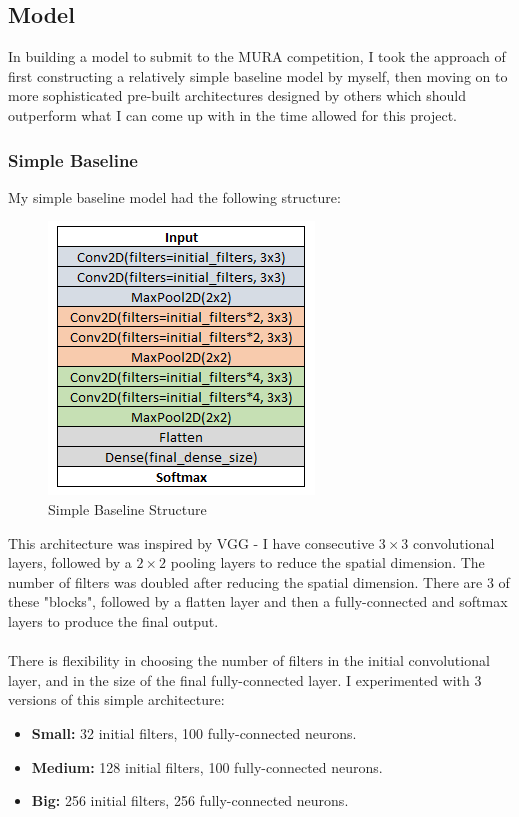 \documentclass[11pt]{article} %
\theoremstyle{plain}
\theoremstyle{definition}
\begin{document}
\subsection{Model}
In building a model to submit to the MURA competition, I took the approach of first constructing a relatively simple baseline model by myself, then moving on to more sophisticated pre-built architectures designed by others which should outperform what I can come up with in the time allowed for this project.
\subsubsection{Simple Baseline} \label{Simple-Baseline}
My simple baseline model had the following structure:
\begin{figure}[!ht]
\centering
\includegraphics[scale=0.7]{SimpleBaselineModel.PNG}
\caption{Simple Baseline Structure}
\label{fig:SimpleBaselineModel}
\end{figure}
\FloatBarrier
\noindent
This architecture was inspired by VGG - I have consecutive \(3 \times 3\) convolutional layers, followed by a \(2 \times 2\) pooling layers to reduce the spatial dimension. The number of filters was doubled after reducing the spatial dimension. There are 3 of these "blocks", followed by a flatten layer and then a fully-connected and softmax layers to produce the final output. 
\\
\\
\noindent
There is flexibility in choosing the number of filters in the initial convolutional layer, and in the size of the final fully-connected layer. I experimented with 3 versions of this simple architecture:
\begin{itemize}
\item \textbf{Small:} 32 initial filters, 100 fully-connected neurons.
\item \textbf{Medium:} 128 initial filters, 100 fully-connected neurons.
\item \textbf{Big:} 256 initial filters, 256 fully-connected neurons.
\end{itemize}
\end{document}
